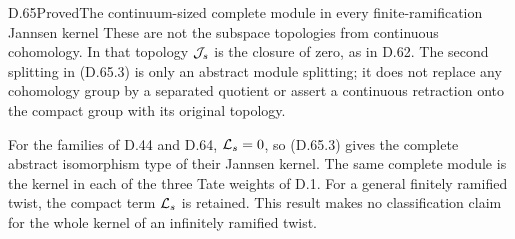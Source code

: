 \begin{statement}{D.65}{Proved}{The continuum-sized complete module in every finite-ramification Jannsen kernel}
These are not the subspace topologies from continuous
cohomology. In that topology \({\cal J}_s\) is the
closure of zero, as in D.62. The second splitting in
(D.65.3) is only an abstract module splitting; it does
not replace any cohomology group by a separated
quotient or assert a continuous retraction onto the
compact group with its original topology.

For the families of D.44 and D.64,
\({\cal L}_s=0\), so (D.65.3) gives the complete
abstract isomorphism type of their Jannsen kernel.
The same complete module is the kernel in each of
the three Tate weights of D.1. For a general finitely
ramified twist, the compact term \({\cal L}_s\)
is retained. This result makes no classification
claim for the whole kernel of an infinitely
ramified twist.
\end{statement}

